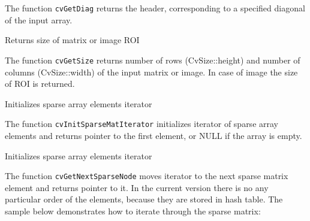 The function \texttt{cvGetDiag} returns the header, corresponding to a specified diagonal of the input array.

\label{GetSize}

Returns size of matrix or image ROI


\begin{description}
\end{description}

The function \texttt{cvGetSize} returns number of rows (CvSize::height) and number of columns (CvSize::width) of the input matrix or image. In case of image the size of ROI is returned.


\label{InitSparseMatIterator}

Initializes sparse array elements iterator


\begin{description}
\end{description}

The function \texttt{cvInitSparseMatIterator} initializes iterator of
sparse array elements and returns pointer to the first element, or NULL
if the array is empty.

\label{GetNextSparseNode}

Initializes sparse array elements iterator


\begin{description}
\end{description}


The function \texttt{cvGetNextSparseNode} moves iterator to the next sparse matrix element and returns pointer to it. In the current version there is no any particular order of the elements, because they are stored in hash table. The sample below demonstrates how to iterate through the sparse matrix:

